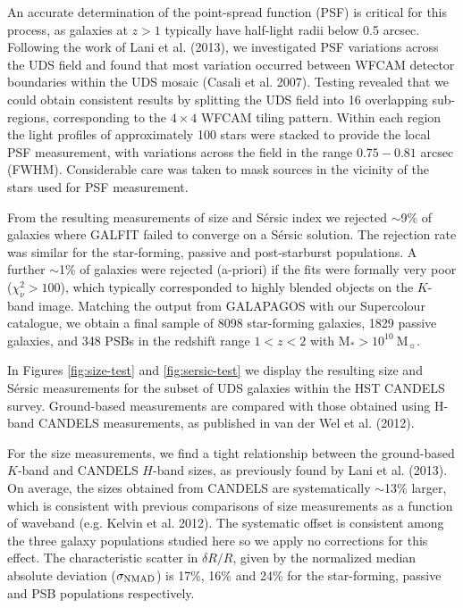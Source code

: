 \documentclass[a4paper,fleqn,usenatbib,useAMS]{mnras}
\begin{document}
An accurate determination of the point-spread function (PSF) is
critical for this process, as galaxies at $z>1$ typically have
half-light radii below 0.5 arcsec. Following the work of Lani et
al. (2013), we investigated PSF variations across the UDS field and
found that most variation occurred between WFCAM detector boundaries
within the UDS mosaic (Casali et al. 2007).  Testing revealed that we
could obtain consistent results by splitting the UDS field into 16
overlapping sub-regions, corresponding to the $4\times 4$ WFCAM tiling
pattern. Within each region the light profiles of approximately 100
stars were stacked to provide the local PSF measurement, with
variations across the field in the range $0.75-0.81$ arcsec
(FWHM). Considerable care was taken to mask sources in the vicinity of
the stars used for PSF measurement.



From the resulting measurements of size and S\'{e}rsic index we rejected
$\sim$9\% of galaxies where GALFIT failed to converge on a S\'{e}rsic
solution.  The rejection rate was similar for the star-forming,
passive and post-starburst populations. A further $\sim$1\% of
galaxies were rejected (a-priori) if the fits were formally very poor
($\chi^2_\nu>100$), which typically corresponded to highly blended
objects on the $K$-band image. Matching the output from
\textsc{GALAPAGOS} with our Supercolour catalogue, we obtain a final
sample of 8098 star-forming galaxies, 1829 passive galaxies, and 348
PSBs in the redshift range $1<z<2$ with M$_{\ast}> 10^{10}
~$M$_{\sun}$.

In Figures \ref{fig:size-test} and \ref{fig:sersic-test} we display
the resulting size and S\'{e}rsic measurements for the subset of UDS
galaxies within the HST CANDELS survey. Ground-based measurements are
compared with those obtained using H-band CANDELS measurements, as
published in van der Wel et al. (2012).  

For the size measurements, we find a  tight relationship between
the ground-based $K$-band and CANDELS $H$-band sizes, as previously
found by Lani et al. (2013).  On average, the sizes obtained from
CANDELS are systematically $\sim$13\% larger, which is consistent
with previous comparisons of size measurements as a function of
waveband (e.g. Kelvin et al. 2012). The systematic offset is
consistent among the three galaxy populations studied here so we apply
no corrections for this effect.  The characteristic scatter in $\delta
R/R$, given by the normalized median absolute deviation ($\sigma_{{\rm
    NMAD}}$) is 17\%, 16\% and 24\% for the star-forming, passive and
PSB populations respectively.
\end{document}
